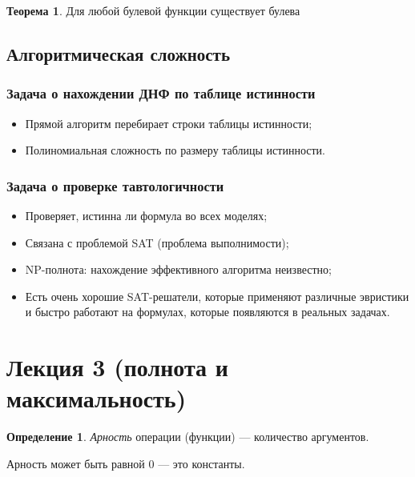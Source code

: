 \documentclass[12pt]{article}
\theoremstyle{definition}
\newtheorem{definition}{Определение}[section]
\newtheorem{theorem}{Теорема}[section]
\theoremstyle{statement}
\theoremstyle{theorem}
\begin{document}
\begin{theorem}
  Для любой булевой функции существует булева
\end{theorem}

\subsection{Алгоритмическая сложность}
\subsubsection{Задача о нахождении ДНФ по таблице истинности}
\begin{itemize}
  \item Прямой алгоритм перебирает строки таблицы истинности;

  \item Полиномиальная сложность по размеру таблицы истинности.
\end{itemize}

\subsubsection{Задача о проверке тавтологичности}
\begin{itemize}
  \item Проверяет, истинна ли формула во всех моделях;

  \item Связана с проблемой SAT (проблема выполнимости);

  \item NP-полнота: нахождение эффективного алгоритма неизвестно;

  \item Есть очень хорошие SAT-решатели, которые применяют различные
    эвристики и быстро работают на формулах, которые появляются в
    реальных задачах.
\end{itemize}

\pagebreak

\section{Лекция 3 (полнота и максимальность)}
\begin{definition}
  \textit{Арность} операции (функции) --- количество аргументов.
\end{definition}

Арность может быть равной 0 --- это константы.
\end{document}
